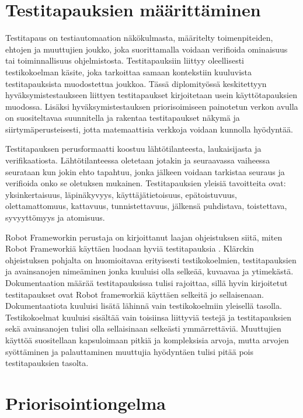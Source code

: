 \section{Testitapauksien määrittäminen} \label{ch:08_testitapauksien_maarittaminen}

  Testitapaus on testiautomaation näkökulmasta, määritelty toimenpiteiden, ehtojen ja muuttujien joukko, joka suorittamalla voidaan verifioida ominaisuus tai toiminnallisuus ohjelmistosta.
  Testitapauksiin liittyy oleellisesti testikokoelman käsite, joka tarkoittaa samaan kontekstiin kuuluvista testitapauksista muodostettua joukkoa.
  Tässä diplomityössä keskitettyyn hyväksymistestaukseen liittyen testitapaukset kirjoitetaan usein käyttötapauksien muodossa.
  Lisäksi hyväksymistestauksen priorisoimiseen painotetun verkon avulla on suositeltavaa suunnitella ja rakentaa testitapaukset näkymä ja siirtymäperusteisesti, jotta matemaattisia verkkoja voidaan kunnolla hyödyntää.

  Testitapauksen perusformaatti koostuu lähtötilanteesta, laukaisijasta ja verifikaatiosta.
  Lähtötilanteessa oletetaan jotakin ja seuraavassa vaiheessa seurataan kun jokin ehto tapahtuu, jonka jälkeen voidaan tarkistaa seuraus ja verifioida onko se oletuksen mukainen.
  Testitapauksien yleisiä tavoitteita ovat: yksinkertaisuus, läpinäkyvyys, käyttäjätietoisuus, epätoistuvuus, olettamattomuus, kattavuus, tunnistettavuus, jälkensä puhdistava, toistettava, syvyyttömyys ja atomisuus.

  Robot Frameworkin perustaja on kirjoittanut laajan ohjeistuksen siitä, miten Robot Frameworkiä käyttäen luodaan hyviä testitapauksia \parencite{klarck_how-to-write-good-test-cases_2019}.
  Klärckin ohjeistuksen pohjalta on huomioitavaa erityisesti testikokoelmien, testitapauksien ja avainsanojen nimeäminen jonka kuuluisi olla selkeää, kuvaavaa ja ytimekästä.
  Dokumentaation määrää testitapauksissa tulisi rajoittaa, sillä hyvin kirjoitetut testitapaukset ovat Robot frameworkiä käyttäen selkeitä jo sellaisenaan.
  Dokumentaatiota kuuluisi lisätä lähinnä vain testikokoelmiin yleisellä tasolla.
  Testikokoelmat kuuluisi sisältää vain toisiinsa liittyviä testejä ja testitapauksien sekä avainsanojen tulisi olla sellaisinaan selkeästi ymmärrettäviä.
  Muuttujien käyttöä suositellaan kapsuloimaan pitkiä ja kompleksisia arvoja, mutta arvojen syöttäminen ja palauttaminen muuttujia hyödyntäen tulisi pitää pois testitapauksien tasolta.

\section{Priorisointiongelma} \label{ch:08_priorisointiongelma}

